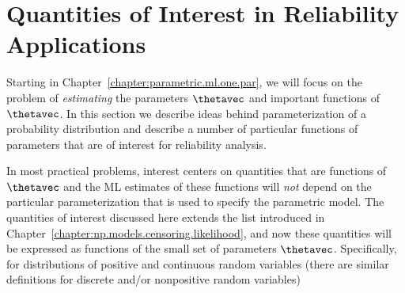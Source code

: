 \section{Quantities of Interest in Reliability Applications}
\label{section:quantities.of.interest}
Starting in Chapter~\ref{chapter:parametric.ml.one.par}, we will focus
on the problem of {\em estimating} the parameters $\thetavec$ and
important functions of $\thetavec$. In this section
we describe ideas behind parameterization of a probability
distribution
and describe a number of particular functions of parameters
that are of interest for reliability analysis.



\label{section:functions.of.parameters}
In most practical problems, interest centers on quantities that are
functions of $\thetavec$ and the ML estimates of these functions will
{\em not} depend on the particular parameterization that is used to
specify the parametric model. The quantities of interest discussed
here extends the list introduced in
Chapter~\ref{chapter:np.models.censoring.likelihood}, and now these
quantities will be expressed as functions of the small set of
parameters $\thetavec$. Specifically, for distributions of positive
and continuous random variables (there are similar definitions for
discrete and/or nonpositive random variables)

